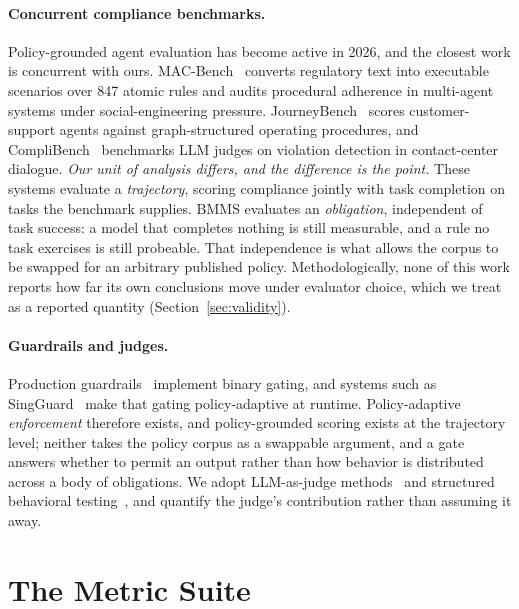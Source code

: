 \documentclass{article}
\begin{document}
\paragraph{Concurrent compliance benchmarks.}
Policy-grounded agent evaluation has become active in 2026, and the closest work is concurrent with ours. MAC-Bench~\cite{zhao2026macbench} converts regulatory text into executable scenarios over 847 atomic rules and audits procedural adherence in multi-agent systems under social-engineering pressure. JourneyBench~\cite{balaji2026journeybench} scores customer-support agents against graph-structured operating procedures, and CompliBench~\cite{yang2026complibench} benchmarks LLM judges on violation detection in contact-center dialogue. \emph{Our unit of analysis differs, and the difference is the point.} These systems evaluate a \emph{trajectory}, scoring compliance jointly with task completion on tasks the benchmark supplies. BMMS evaluates an \emph{obligation}, independent of task success: a model that completes nothing is still measurable, and a rule no task exercises is still probeable. That independence is what allows the corpus to be swapped for an arbitrary published policy. Methodologically, none of this work reports how far its own conclusions move under evaluator choice, which we treat as a reported quantity (Section~\ref{sec:validity}).

\paragraph{Guardrails and judges.}
Production guardrails~\cite{rebedea2023nemo,graniteguardian2024} implement binary gating, and systems such as SingGuard~\cite{bai2026singguard} make that gating policy-adaptive at runtime. Policy-adaptive \emph{enforcement} therefore exists, and policy-grounded scoring exists at the trajectory level; neither takes the policy corpus as a swappable argument, and a gate answers whether to permit an output rather than how behavior is distributed across a body of obligations. We adopt LLM-as-judge methods~\cite{zheng2023judging} and structured behavioral testing~\cite{ribeiro2020checklist}, and quantify the judge's contribution rather than assuming it away.
\section{The Metric Suite}
\label{sec:framework}
\end{document}

